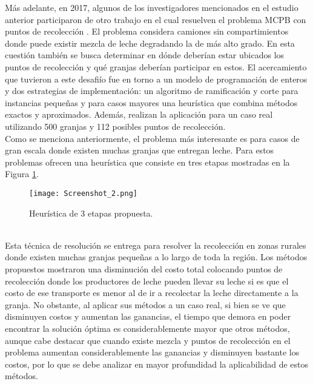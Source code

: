 \documentclass[letter, 10pt]{article}
\begin{document}
M\'as adelante, en 2017, algunos de los investigadores mencionados en el estudio anterior participaron de otro trabajo en el cual resuelven el problema MCPB con puntos de recolecci\'on \cite{puntos}. El problema considera camiones sin compartimientos donde puede existir mezcla de leche degradando la de m\'as alto grado. En esta cuesti\'on tambi\'en se busca determinar en d\'onde deber\'ian estar ubicados los puntos de recolecci\'on y qu\'e granjas deber\'ian participar en estos. El acercamiento que tuvieron a este desafi\'io fue en torno a un modelo de programaci\'on de enteros y dos estrategias de implementaci\'on: un algoritmo de ramificaci\'on y corte para instancias peque\~{n}as y para casos mayores una heur\'istica que combina m\'etodos exactos y aproximados. Adem\'as, realizan la aplicaci\'on para un caso real utilizando 500 granjas y 112 posibles puntos de recolecci\'on. \\

Como se menciona anteriormente, el problema m\'as interesante es para casos de gran escala donde existen muchas granjas que entregan leche. Para estos problemas ofrecen una heur\'istica que consiste en tres etapas mostradas en la Figura \ref{process2}.

\begin{figure}[H]
\centering
\texttt{[image: Screenshot\_2.png]}
\caption{Heur\'istica de 3 etapas propuesta.}
\label{process2}
\end{figure} \\

Esta t\'ecnica de resoluci\'on se entrega para resolver la recolecci\'on en zonas rurales donde existen muchas granjas peque\~{n}as a lo largo de toda la regi\'on. Los m\'etodos propuestos mostraron una disminuci\'on del costo total colocando puntos de recolecci\'on donde los productores de leche pueden llevar su leche si es que el costo de ese transporte es menor al de ir a recolectar la leche directamente a la granja. No obstante, al aplicar sus m\'etodos a un caso real, si bien se ve que disminuyen costos y aumentan las ganancias, el tiempo que demora en poder encontrar la soluci\'on \'optima es considerablemente mayor que otros m\'etodos, aunque cabe destacar que cuando existe mezcla y puntos de recolecci\'on en el problema aumentan considerablemente las ganancias y disminuyen bastante los costos, por lo que se debe analizar en mayor profundidad la aplicabilidad de estos m\'etodos. \\
\end{document}
